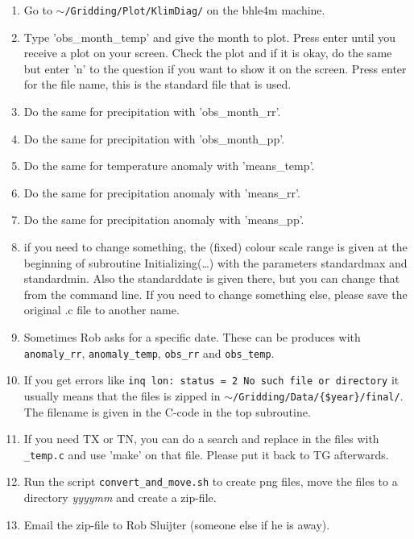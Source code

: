 \documentclass[a4paper]{article}
\begin{document}
\begin{enumerate}
\item Go to \texttt{$\sim$/Gridding/Plot/KlimDiag/} on the bhle4m
  machine.
\item Type 'obs\_month\_temp' and give the month to plot. Press enter
  until you receive a plot on your screen. Check the plot and if it is
  okay, do the same but enter 'n' to the question if you want to show
  it on the screen. Press enter for the file name, this is the
  standard file that is used.
\item Do the same for precipitation with 'obs\_month\_rr'.
\item Do the same for precipitation with 'obs\_month\_pp'.
\item Do the same for temperature anomaly with 'means\_temp'.
\item Do the same for precipitation anomaly with 'means\_rr'.
\item Do the same for precipitation anomaly with 'means\_pp'.
\item if you need to change something, the (fixed) colour scale range
  is given at the beginning of subroutine Initializing(\dots) with the
  parameters standardmax and standardmin. Also the standarddate is
  given there, but you can change that from the command line. If you
  need to change something else, please save the original .c file to
  another name.
\item Sometimes Rob asks for a specific date. These can be produces
  with \texttt{anomaly\_rr}, \texttt{anomaly\_temp}, \texttt{obs\_rr}
  and \texttt{obs\_temp}.
\item If you get errors like \texttt{inq lon: status = 2 No such file
    or directory} it usually means that the files is zipped in
  \texttt{$\sim$/Gridding/Data/\{\$year\}/final/}. The filename is given in
  the C-code in the top subroutine.
\item If you need TX or TN, you can do a search and replace in the
  files with \texttt{\_temp.c} and use 'make' on that file. Please put
  it back to TG afterwards.
\item Run the script \texttt{convert\_and\_move.sh} to create png
  files, move the files to a directory \textit{yyyymm} and create a
  zip-file.
\item Email the zip-file to Rob Sluijter (someone else if he is away).
\end{enumerate}
\end{document}
